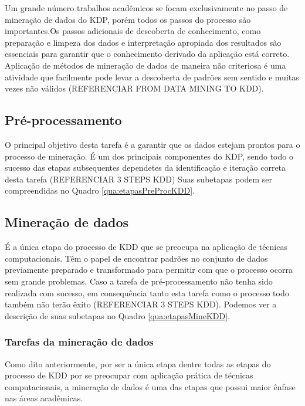 Um grande número trabalhos acadêmicos se focam exclusivamente no passo de mineração de dados do KDP, porém todos os passos do processo são importantes.Os passos adicionais de descoberta de conhecimento, como preparação e limpeza dos dados e interpretação apropiada dos resultados	são essenciais para garantir que o conhecimento derivado da aplicação está correto. Aplicação de métodos de mineração de dados de maneira não criteriosa é uma atividade que facilmente pode levar a descoberta de padrões sem sentido e muitas vezes não válidos (REFERENCIAR FROM DATA MINING TO KDD).

\subsection{Pré-processamento}
\label{subsec:preprocKDD}

O principal objetivo desta tarefa é a garantir que os dados estejam prontos para o processo de mineração. É um dos principais componentes do KDP, sendo todo o sucesso das etapas subsequentes dependetes da identificação e iteração correta desta tarefa (REFERENCIAR 3 STEPS KDD) Suas subetapas podem ser compreendidas no Quadro \ref{qua:etapasPreProcKDD}.



\subsection{Mineração de dados}
\label{subsec:mineKDD}

É a única etapa do processo de KDD que se preocupa na aplicação de técnicas computacionais. Têm o papel de encontrar padrões no conjunto de dados previamente preparado e transformado para permitir com que o processo ocorra sem grande problemas. Caso a tarefa de pré-processamento não tenha sido realizada com sucesso, em consequência tanto esta tarefa como o processo todo também não terão êxito (REFERENCIAR 3 STEPS KDD). Podemos ver a descrição de suas subetapas no Quadro \ref{qua:etapasMineKDD}.



\subsubsection{Tarefas da mineração de dados}
\label{subsubsec:tarefasMineKDD}

Como dito anteriormente, por ser a única etapa dentre todas as etapas do processo de KDD por se preocupar com aplicação prática de técnicas computacionais, a mineração de dados é uma das etapas que possui maior ênfase nas áreas acadêmicas.

